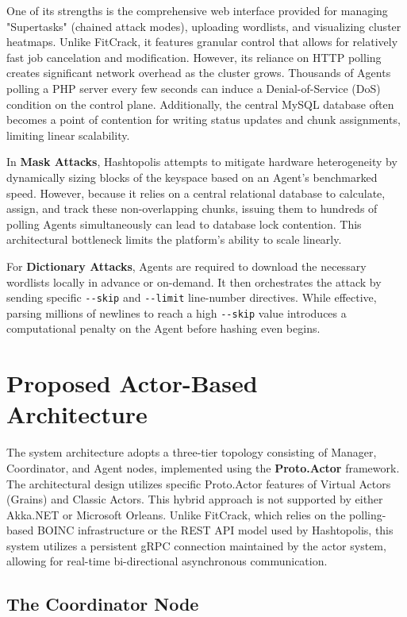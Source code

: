 One of its strengths is the comprehensive web interface provided for managing "Supertasks" (chained attack modes), uploading wordlists, and visualizing cluster heatmaps. Unlike FitCrack, it features granular control that allows for relatively fast job cancelation and modification. However, its reliance on HTTP polling creates significant network overhead as the cluster grows. Thousands of Agents polling a PHP server every few seconds can induce a Denial-of-Service (DoS) condition on the control plane. Additionally, the central MySQL database often becomes a point of contention for writing status updates and chunk assignments, limiting linear scalability.

In \textbf{Mask Attacks}, Hashtopolis attempts to mitigate hardware heterogeneity by dynamically sizing blocks of the keyspace based on an Agent's benchmarked speed. However, because it relies on a central relational database to calculate, assign, and track these non-overlapping chunks, issuing them to hundreds of polling Agents simultaneously can lead to database lock contention. This architectural bottleneck limits the platform's ability to scale linearly.

For \textbf{Dictionary Attacks}, Agents are required to download the necessary wordlists locally in advance or on-demand. It then orchestrates the attack by sending specific \verb|--skip| and \verb|--limit| line-number directives. While effective, parsing millions of newlines to reach a high \verb|--skip| value introduces a computational penalty on the Agent before hashing even begins.

\newpage

\section{Proposed Actor-Based Architecture}

The system architecture adopts a three-tier topology consisting of Manager, Coordinator, and Agent nodes, implemented using the \textbf{Proto.Actor} framework. The architectural design utilizes specific Proto.Actor features of Virtual Actors (Grains) and Classic Actors. This hybrid approach is not supported by either Akka.NET or Microsoft Orleans. Unlike FitCrack, which relies on the polling-based BOINC infrastructure or the REST API model used by Hashtopolis, this system utilizes a persistent gRPC connection maintained by the actor system, allowing for real-time bi-directional asynchronous communication. 

\subsection{The Coordinator Node}


